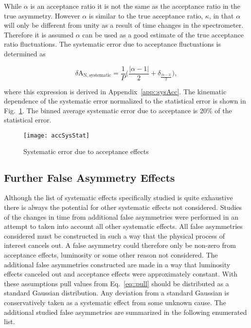 While $\alpha$ is an acceptance ratio it is not the same as the acceptance ratio
in the true asymmetry.  However $\alpha$ is similar to the true acceptance
ratio, $\kappa$, in that $\alpha$ will only be different from unity as a result
of time changes in the spectrometer.  Therefore it is assumed $\alpha$ can be
used as a good estimate of the true acceptance ratio fluctuations.  The
systematic error due to acceptance fluctuations is determined as

\begin{equation}
  \delta\mathrm{A}_{\mathrm{N,systematic}} =
  \frac{1}{P} \Big(\frac{|\alpha-1|}{2} + \delta_{\frac{|\alpha-1|}{2}} \Big),
\end{equation}

\noindent
where this expression is derived in Appendix~\ref{app::sysAcc}.  The kinematic
dependence of the systematic error normalized to the statistical error is shown
in Fig.~\ref{fig::accSysStat}.  The binned average systematic error due to
acceptance is 20\% of the statistical error.

\begin{figure}[h!t]
  \begin{center}
    \texttt{[image: accSysStat]}
    \caption{Systematic error due to acceptance effects}
    \label{fig::accSysStat}
  \end{center}
\end{figure}

\subsection{Further False Asymmetry Effects}
Although the list of systematic effects specifically studied is quite exhaustive
there is always the potential for other systematic effects not considered.
Studies of the changes in time from additional false asymmetries were performed
in an attempt to taken into account all other systematic effects.  All false
asymmetries considered must be constructed in such a way that the physical
process of interest cancels out.  A false asymmetry could therefore only be
non-zero from acceptance effects, luminosity or some other reason not
considered.  The additional false asymmetries constructed are made in a way that
luminosity effects canceled out and acceptance effects were approximately
constant.  With these assumptions pull values from Eq.~\ref{eq::pull} should be
distributed as a standard Gaussian distribution.  Any deviation from a standard
Gaussian is conservatively taken as a systematic effect from some unknown cause.
The additional studied false asymmetries are summarized in the following
enumerated list.

